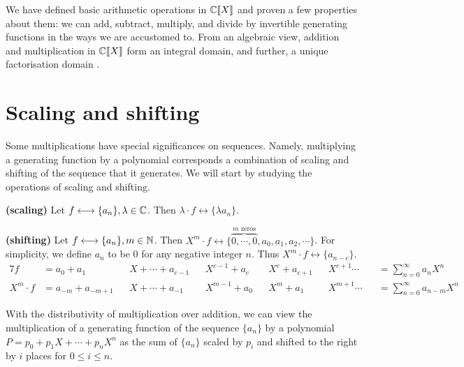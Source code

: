 \documentclass[a4paper, 12pt]{report}
\begin{document}
We have defined basic arithmetic operations in $\mathbb{C}\llbracket X\rrbracket$ and proven a few properties about them: we can add, subtract, multiply, and divide by invertible generating functions in the ways we are accustomed to. From an algebraic view, addition and multiplication in $\mathbb{C}\llbracket X\rrbracket$ form an integral domain, and further, a unique factorisation domain \autocite[873]{niven}.

\section{Scaling and shifting}
Some multiplications have special significances on sequences. Namely, multiplying a generating function by a polynomial corresponds a combination of scaling and shifting of the sequence that it generates. We will start by studying the operations of scaling and shifting.

\begin{rem}\label{rem:gf-scaling}
\textbf{(scaling)} Let $f \longleftrightarrow \{a_n\}, \lambda \in \mathbb{C}$. Then $\lambda \cdot f \longleftrightarrow \{\lambda a_n\}$.
\end{rem}

\begin{rem}\label{rem:gf-shifting}
\textbf{(shifting)} Let $f \longleftrightarrow \{a_n\}, m \in \mathbb{N}$. Then $X^m \cdot f \longleftrightarrow \{\overbrace{0, \cdots, 0}^{m\text{ zeros}}, a_0, a_1, a_2, \cdots\}$. For simplicity, we define $a_{n}$ to be $0$ for any negative integer $n$. Thus $X^m \cdot f \longleftrightarrow \{a_{n - c}\}$.
\begin{alignat*}{7}
    f &= a_0 + a_1 &&X + \cdots + a_{c - 1} &&X^{c - 1} + a_c &&X^c + a_{c + 1} &&X^{c + 1} \cdots &&= \sum\nolimits_{n = 0}^\infty a_n X^n\\
    X^m \cdot f &= a_{-m} + a_{-m + 1}&&X + \cdots + a_{-1} &&X^{m - 1} + a_0 &&X^m + a_1 &&X^{m + 1}\cdots &&= \sum\nolimits_{n = 0}^\infty a_{n - m} X^n
\end{alignat*}
\end{rem}

With the distributivity of multiplication over addition, we can view the multiplication of a generating function of the sequence $\{a_n\}$ by a polynomial $P = p_0 + p_1 X + \cdots + p_n X^n$ as the sum of $\{a_n\}$ scaled by $p_i$ and shifted to the right by $i$ places for $0 \leq i \leq n$.
\end{document}

